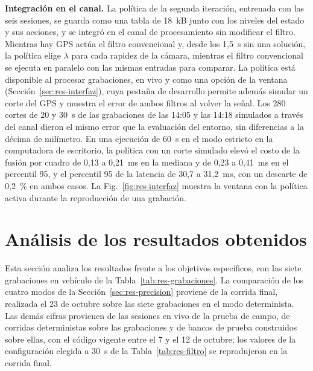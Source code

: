 \textbf{Integración en el canal.}
La política de la segunda iteración, entrenada con las seis sesiones, se guarda como una tabla de 18~kB junto con los niveles del estado y sus acciones, y se integró en el canal de procesamiento sin modificar el filtro.
Mientras hay GPS actúa el filtro convencional y, desde los 1,5~s sin una solución, la política elige $\lambda$ para cada rapidez de la cámara, mientras el filtro convencional se ejecuta en paralelo con las mismas entradas para comparar.
La política está disponible al procesar grabaciones, en vivo y como una opción de la ventana (Sección~\ref{sec:res-interfaz}), cuya pestaña de desarrollo permite además simular un corte del GPS y muestra el error de ambos filtros al volver la señal.
Los 280 cortes de 20 y 30~s de las grabaciones de las 14:05 y las 14:18 simulados a través del canal dieron el mismo error que la evaluación del entorno, sin diferencias a la décima de milímetro.
En una ejecución de 60~s en el modo estricto en la computadora de escritorio, la política con un corte simulado elevó el costo de la fusión por cuadro de 0,13 a 0,21~ms en la mediana y de 0,23 a 0,41~ms en el percentil 95, y el percentil 95 de la latencia de 30,7 a 31,2~ms, con un descarte de 0,2~\% en ambos casos.
La Fig.~\ref{fig:res-interfaz} muestra la ventana con la política activa durante la reproducción de una grabación.


\section{Análisis de los resultados obtenidos}
\label{sec:res-analisis}

Esta sección analiza los resultados frente a los objetivos específicos, con las siete grabaciones en vehículo de la Tabla~\ref{tab:res-grabaciones}.
La comparación de los cuatro modos de la Sección~\ref{sec:res-precision} proviene de la corrida final, realizada el 23 de octubre sobre las siete grabaciones en el modo determinista.
Las demás cifras provienen de las sesiones en vivo de la prueba de campo, de corridas deterministas sobre las grabaciones y de bancos de prueba construidos sobre ellas, con el código vigente entre el 7 y el 12 de octubre; los valores de la configuración elegida a 30~s de la Tabla~\ref{tab:res-filtro} se reprodujeron en la corrida final.

